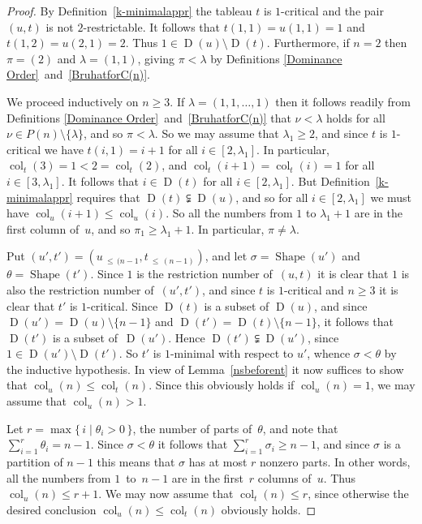 \documentclass[10pt]{amsart}
\theoremstyle{definition}
\DeclareMathOperator{\col}{col}
\newcommand{\Lessthan}[2]{#1\,{_{\leqslant\,#2}}}
\DeclareMathOperator{\shape}{Shape}
\DeclareMathOperator{\D}{D}
\begin{document}
\begin{proof}
By Definition~\ref{k-minimalappr} the tableau $t$ is $1$-critical and the pair
$(u,t)$ is not $2$-restrictable. It follows that
$t(1,1)=u(1,1)=1$ and $t(1,2)=u(2,1)=2$. Thus $1\in\D(u)\setminus\D(t)$.
Furthermore, if $n=2$ then
$\pi=(2)$ and $\lambda=(1,1)$, giving $\pi<\lambda$ by
Definitions \ref{Dominance Order}~and~\ref{BruhatforC(n)}.

We proceed inductively on $n\geq 3$. If $\lambda=(1,1,\ldots,1)$ then it
follows readily from Definitions \ref{Dominance Order}~and~\ref{BruhatforC(n)}
that $\nu<\lambda$ holds for all $\nu\in P(n)\setminus\{\lambda\}$, and so
$\pi<\lambda$. So we may assume that $\lambda_1\geqslant 2$, and since $t$ is
$1$-critical we have $t(i,1)=i+1$ for all $i\in[2,\lambda_1]$. In particular,
$\col_t(3)=1<2=\col_t(2)$, and $\col_t(i+1)=\col_t(i)=1$ for all $i\in[3,\lambda_1]$.
It follows that $i\in\D(t)$ for all $i\in[2,\lambda_1]$. But Definition~\ref{k-minimalappr}
requires that $\D(t)\subsetneqq\D(u)$, and so for all $i\in[2,\lambda_1]$
we must have $\col_u(i+1)\leqslant\col_u(i)$. So all the numbers from $1$ to
$\lambda_1+1$ are in the first column of~$u$, and so $\pi_1\geqslant\lambda_1+1$.
In particular, $\pi\ne\lambda$.

Put $(u',t')=(\Lessthan u{(n-1},\Lessthan t{(n-1)})$, and let
$\sigma=\shape(u')$ and $\theta=\shape(t')$. Since $1$ is the restriction
number of~$(u,t)$ it is clear that $1$ is also the restriction number of~$(u',t')$,
and since $t$ is $1$-critical and $n\geqslant 3$ it is clear that $t'$
is $1$-critical. Since $\D(t)$ is a subset of $\D(u)$, and since
$\D(u')=\D(u)\setminus\{n-1\}$ and $\D(t')=\D(t)\setminus\{n-1\}$, it follows
that $\D(t')$ is a subset of~$\D(u')$. Hence $\D(t')\subsetneqq\D(u')$,
since $1\in\D(u')\setminus\D(t')$. So $t'$ is $1$-minimal with respect to
$u'$, whence $\sigma<\theta$ by the inductive hypothesis. In view of
Lemma~\ref{nsbeforent} it now suffices to show that
$\col_u(n)\leqslant\col_t(n)$. Since this obviously holds if
$\col_u(n)=1$, we may assume that $\col_u(n)>1$.

Let $r=\max\{\,i\mid\theta_i>0\,\}$, the number of parts of~$\theta$, and note
that $\sum_{i=1}^r\theta_i=n-1$. Since $\sigma<\theta$ it follows that
$\sum_{i=1}^r\sigma_i\geqslant n-1$, and since $\sigma$ is a partition of $n-1$
this means that $\sigma$ has at most $r$ nonzero parts. In other words, all the numbers
from $1$~to~$n-1$ are in the first~$r$ columns of~$u$. Thus $\col_u(n)\leqslant r+1$.
We may now assume that $\col_t(n)\leqslant r$, since otherwise the
desired conclusion $\col_u(n)\leqslant\col_t(n)$ obviously holds.


\end{proof}
\end{document}
